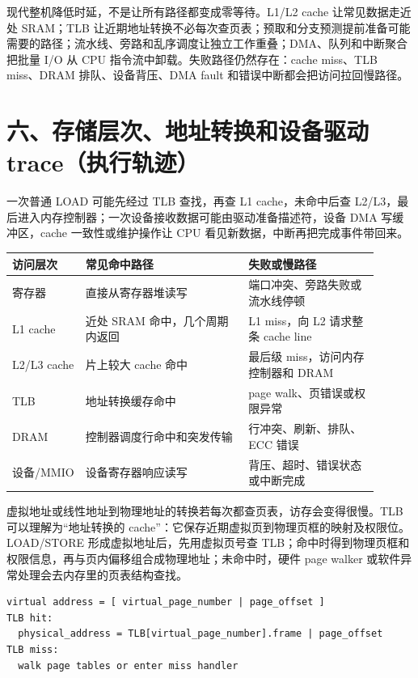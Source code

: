 现代整机降低时延，不是让所有路径都变成零等待。L1/L2 cache 让常见数据走近处 SRAM；TLB 让近期地址转换不必每次查页表；预取和分支预测提前准备可能需要的路径；流水线、旁路和乱序调度让独立工作重叠；DMA、队列和中断聚合把批量 I/O 从 CPU 指令流中卸载。失败路径仍然存在：cache miss、TLB miss、DRAM 排队、设备背压、DMA fault 和错误中断都会把访问拉回慢路径。

\section{六、存储层次、地址转换和设备驱动 trace（执行轨迹）}

一次普通 LOAD 可能先经过 TLB 查找，再查 L1 cache，未命中后查 L2/L3，最后进入内存控制器；一次设备接收数据可能由驱动准备描述符，设备 DMA 写缓冲区，cache 一致性或维护操作让 CPU 看见新数据，中断再把完成事件带回来。

\begin{longtable}{L{0.18\linewidth}L{0.4\linewidth}L{0.32\linewidth}}
\toprule
访问层次 & 常见命中路径 & 失败或慢路径 \\
\midrule
寄存器 & 直接从寄存器堆读写 & 端口冲突、旁路失败或流水线停顿 \\
L1 cache & 近处 SRAM 命中，几个周期内返回 & L1 miss，向 L2 请求整条 cache line \\
L2/L3 cache & 片上较大 cache 命中 & 最后级 miss，访问内存控制器和 DRAM \\
TLB & 地址转换缓存命中 & page walk、页错误或权限异常 \\
DRAM & 控制器调度行命中和突发传输 & 行冲突、刷新、排队、ECC 错误 \\
设备/MMIO & 设备寄存器响应读写 & 背压、超时、错误状态或中断完成 \\
\bottomrule
\end{longtable}

虚拟地址或线性地址到物理地址的转换若每次都查页表，访存会变得很慢。TLB 可以理解为“地址转换的 cache”：它保存近期虚拟页到物理页框的映射及权限位。LOAD/STORE 形成虚拟地址后，先用虚拟页号查 TLB；命中时得到物理页框和权限信息，再与页内偏移组合成物理地址；未命中时，硬件 page walker 或软件异常处理会去内存里的页表结构查找。

\begin{lstlisting}
virtual address = [ virtual_page_number | page_offset ]
TLB hit:
  physical_address = TLB[virtual_page_number].frame | page_offset
TLB miss:
  walk page tables or enter miss handler
\end{lstlisting}

